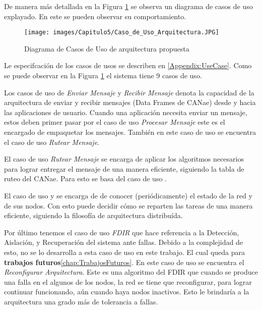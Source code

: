 De manera más detallada en la Figura \ref{fig:DiagramaCUArqPropuesta} se
observa un diagrama de casos de uso explayado. En este se pueden observar su
comportamiento.

\begin{figure}[h!]
 \centering
 \texttt{[image: images/Capitulo5/Caso\_de\_Uso\_Arquitectura.JPG]}
  \caption{Diagrama de Casos de Uso de arquitectura propuesta}
\label{fig:DiagramaCUArqPropuesta}
\end{figure} 

Le especifcación de los casos de usos se describen en \ref{Appendix:UseCase}.
Como se puede observar en la Figura \ref{fig:DiagramaCUArqPropuesta}
el sistema tiene 9 casos de uso.

Los casos de uso de \textit{Enviar Mensaje} y \textit{Recibir Mensaje} denota la
capacidad de la arquitectura de enviar y recibir mensajes (Data Frames de
CANae) desde y hacia las aplicaciones de usuario. Cuando una aplicación
necesita enviar un mensaje, estos deben primer pasar por el caso de uso
\textit{Procesar Mensaje} este es el encargado de empaquetar los mensajes.
También en este caso de uso se encuentra el caso de uso \textit{Rutear
  Mensaje}.

El caso de uso \textit{Rutear Mensaje} se encarga de aplicar los algoritmos
necesarios para lograr entregar el mensaje de una manera eficiente, siguiendo
la tabla de ruteo del CANae. Para esto se basa del caso de uso .

El caso de uso  y  se encarga de
de conocer (periódicamente) el estado de la red y de sus nodos. Con esto puede
decidir cómo se reparten las tareas de una manera eficiente, siguiendo
la filosofía de arquitectura distribuída.

Por último tenemos el caso de uso \textit{FDIR} que hace referencia a la
Detección, Aislación, y Recuperación del sistema ante fallas. Debido a la
complejidad de esto, no se lo desarrolla a esta caso de uso en este trabajo.
El cual queda para \textbf{trabajos futuros}\ref{chap:TrabajosFuturos}. En este
caso de uso se encuentra el \textit{Reconfigurar Arquitectura}. Este es una
algoritmo del \ac{FDIR} que cuando se produce una falla en el algunos de los
nodos, la red se tiene que reconfigurar, para lograr continuar funcionando,
aún cuando haya nodos inactivos. Esto le brindaría a la arquitectura una grado
más de tolerancia a fallas. 


